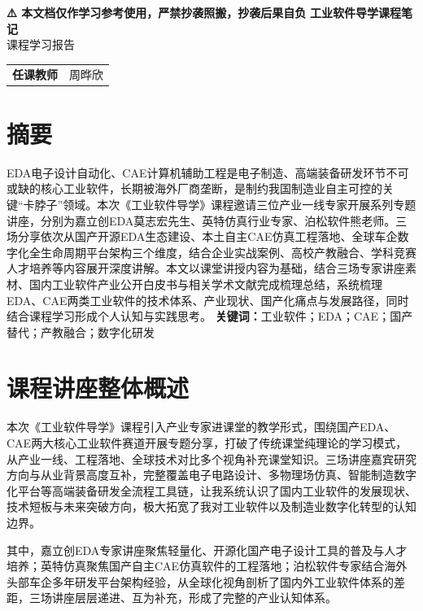 \documentclass[12pt,a4paper]{article}
\begin{document}
\begin{titlepage}
    \centering
    \vspace*{1cm}
    \textbf{\Large \color{red} ⚠️ 本文档仅作学习参考使用，严禁抄袭照搬，抄袭后果自负}
    \vspace{2cm}
    \Huge{\textbf{工业软件导学课程笔记}}\\
    \vspace{1cm}
    \Large{课程学习报告}\\
    \vspace{4cm}
    \begin{tabular}{ll}
        \textbf{任课教师}\hspace{2em} & 周晔欣
    \end{tabular}
    \vspace{3cm}
\end{titlepage}

\section*{摘要}
EDA电子设计自动化、CAE计算机辅助工程是电子制造、高端装备研发环节不可或缺的核心工业软件，长期被海外厂商垄断，是制约我国制造业自主可控的关键“卡脖子”领域。本次《工业软件导学》课程邀请三位产业一线专家开展系列专题讲座，分别为嘉立创EDA莫志宏先生、英特仿真行业专家、泊松软件熊老师。三场分享依次从国产开源EDA生态建设、本土自主CAE仿真工程落地、全球车企数字化全生命周期平台架构三个维度，结合企业实战案例、高校产教融合、学科竞赛人才培养等内容展开深度讲解。本文以课堂讲授内容为基础，结合三场专家讲座素材、国内工业软件产业公开白皮书与相关学术文献完成梳理总结，系统梳理EDA、CAE两类工业软件的技术体系、产业现状、国产化痛点与发展路径，同时结合课程学习形成个人认知与实践思考。
\textbf{关键词：}工业软件；EDA；CAE；国产替代；产教融合；数字化研发

\section{课程讲座整体概述}
本次《工业软件导学》课程引入产业专家进课堂的教学形式，围绕国产EDA、CAE两大核心工业软件赛道开展专题分享，打破了传统课堂纯理论的学习模式，从产业一线、工程落地、全球技术对比多个视角补充课堂知识。三场讲座嘉宾研究方向与从业背景高度互补，完整覆盖电子电路设计、多物理场仿真、智能制造数字化平台等高端装备研发全流程工具链，让我系统认识了国内工业软件的发展现状、技术短板与未来突破方向，极大拓宽了我对工业软件以及制造业数字化转型的认知边界。

其中，嘉立创EDA专家讲座聚焦轻量化、开源化国产电子设计工具的普及与人才培养；英特仿真聚焦国产自主CAE仿真软件的工程落地；泊松软件专家结合海外头部车企多年研发平台架构经验，从全球化视角剖析了国内外工业软件体系的差距，三场讲座层层递进、互为补充，形成了完整的产业认知体系。
\end{document}
